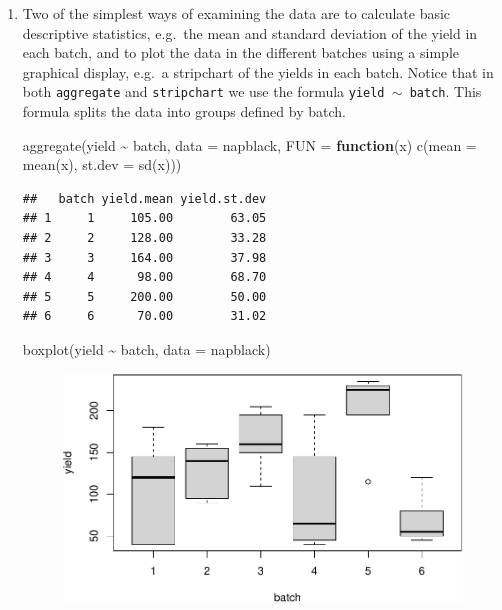 \documentclass[
]{book}
\newenvironment{Shaded}{\begin{snugshade}}{\end{snugshade}}
\newcommand{\AttributeTok}[1]{\textcolor[rgb]{0.77,0.63,0.00}{#1}}
\newcommand{\ControlFlowTok}[1]{\textcolor[rgb]{0.13,0.29,0.53}{\textbf{#1}}}
\newcommand{\FunctionTok}[1]{\textcolor[rgb]{0.00,0.00,0.00}{#1}}
\newcommand{\NormalTok}[1]{#1}
\newcommand{\SpecialCharTok}[1]{\textcolor[rgb]{0.00,0.00,0.00}{#1}}
\theoremstyle{definition}
\theoremstyle{definition}
\theoremstyle{definition}
\theoremstyle{definition}
\theoremstyle{remark}
\begin{document}
\begin{enumerate}
\def\labelenumi{\alph{enumi}.}
\item
  Two of the simplest ways of examining the data are to calculate basic descriptive statistics, e.g.~the mean and standard deviation of the yield in each batch, and to plot the data in the different batches using a simple graphical display, e.g.~a stripchart of the yields in each batch. Notice that in both \texttt{aggregate} and \texttt{stripchart} we use the formula \texttt{yield $\sim$ batch}. This formula splits the data into groups defined by batch.

\begin{Shaded}
\begin{Highlighting}[]
\FunctionTok{aggregate}\NormalTok{(yield }\SpecialCharTok{\textasciitilde{}}\NormalTok{ batch, }\AttributeTok{data =}\NormalTok{ napblack, }\AttributeTok{FUN =} \ControlFlowTok{function}\NormalTok{(x) }\FunctionTok{c}\NormalTok{(}\AttributeTok{mean =} \FunctionTok{mean}\NormalTok{(x), }
                                                          \AttributeTok{st.dev =} \FunctionTok{sd}\NormalTok{(x)))}
\end{Highlighting}
\end{Shaded}

\begin{verbatim}
##   batch yield.mean yield.st.dev
## 1     1     105.00        63.05
## 2     2     128.00        33.28
## 3     3     164.00        37.98
## 4     4      98.00        68.70
## 5     5     200.00        50.00
## 6     6      70.00        31.02
\end{verbatim}

\begin{Shaded}
\begin{Highlighting}[]
\FunctionTok{boxplot}\NormalTok{(yield }\SpecialCharTok{\textasciitilde{}}\NormalTok{ batch, }\AttributeTok{data =}\NormalTok{ napblack)}
\end{Highlighting}
\end{Shaded}

  \begin{figure}

   {\centering \includegraphics{bookdown_math3014-6027_files/figure-latex/napblack-summary-1} 

}
\end{figure}
\end{enumerate}
\end{document}
